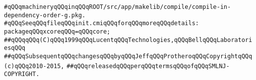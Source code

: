 \verb|#qQQqmachineryqQQqinqQQqROOT/src/app/makelib/compile/compile-in-dependency-order-g.pkg.|\newline
\verb|#qQQqSeeqQQqfileqQQqinit.cmiqQQqforqQQqmoreqQQqdetails:|\newline
\newline
\verb|packageqQQqxcoreqQQq=qQQqcore;|\newline
\newline
\newline
\verb|##qQQqqQQq(C)qQQq1999qQQqLucentqQQqTechnologies,qQQqBellqQQqLaboratoriesqQQq|\newline
\verb|##qQQqSubsequentqQQqchangesqQQqbyqQQqJeffqQQqProtheroqQQqCopyrightqQQq(c)qQQq2010-2015,|\newline
\verb|##qQQqreleasedqQQqperqQQqtermsqQQqofqQQqSMLNJ-COPYRIGHT.|\newline

